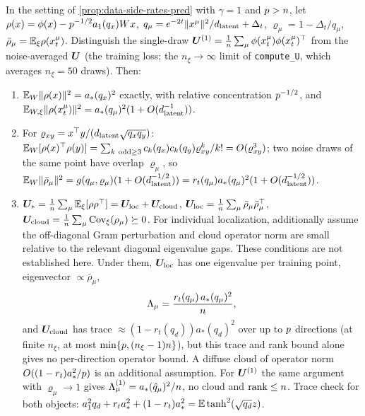 \begin{proposition}\label{prop:sample-bulk-persample-pred}
In the setting of \cref{prop:data-side-rates-pred} with $\gamma=1$ and $p>n$, let $\rho(x)=\phi(x)-p^{-1/2}a_1(q_x)Wx$, $q_\mu=e^{-2t}\|x^\mu\|^2/d_{\mathrm{latent}}+\Delta_t$, $\varrho_\mu=1-\Delta_t/q_\mu$, $\bar\rho_\mu=\mathbb{E}_\xi\rho(x_t^\mu)$. Distinguish the single-draw $\bm{U}^{(1)}=\frac1{n}\sum_\mu\phi(x_t^\mu)\phi(x_t^\mu)^\top$ from the noise-averaged $\bm{U}$ (the training loss; the $n_\xi\to\infty$ limit of \texttt{compute\_U}, which averages $n_\xi=50$ draws). Then:
\begin{enumerate}
\item $\mathbb{E}_W\|\rho(x)\|^2=a_*(q_x)^2$ exactly, with relative concentration $p^{-1/2}$, and $\mathbb{E}_{W,\xi}\|\rho(x_t^\mu)\|^2=a_*(q_\mu)^2(1+O(d_{\mathrm{latent}}^{-1}))$.
\item For $\varrho_{xy}=x^\top y/(d_{\mathrm{latent}}\sqrt{q_xq_y})$: $\E_W[\rho(x)^\top\rho(y)]=\sum_{k\ \mathrm{odd}\ge3}c_k(q_x)c_k(q_y)\varrho_{xy}^k/k!=O(\varrho_{xy}^3)$; two noise draws of the same point have overlap $\varrho_\mu$, so $\mathbb{E}_W\|\bar\rho_\mu\|^2=g(q_\mu,\varrho_\mu)(1+O(d_{\mathrm{latent}}^{-1/2}))=r_t(q_\mu)a_*(q_\mu)^2(1+O(d_{\mathrm{latent}}^{-1/2}))$.
\item $\bm{U}_*=\frac1{n}\sum_\mu\mathbb{E}_\xi[\rho\rho^\top]=\bm{U}_{\rm loc}+\bm{U}_{\rm cloud}$, $\bm{U}_{\rm loc}=\frac1{n}\sum_\mu\bar\rho_\mu\bar\rho_\mu^\top$, $\bm{U}_{\rm cloud}=\frac1{n}\sum_\mu\mathrm{Cov}_\xi(\rho_\mu)\succeq0$. For individual localization, additionally assume the off-diagonal Gram perturbation and cloud operator norm are small relative to the relevant diagonal eigenvalue gaps. These conditions are not established here. Under them, $\bm{U}_{\rm loc}$ has one eigenvalue per training point, eigenvector $\propto\bar\rho_\mu$,
\begin{equation}\label{eq:Lambda-mu-pred}
 \Lambda_\mu=\frac{r_t(q_\mu)\,a_*(q_\mu)^2}{n},
\end{equation}
and $\bm{U}_{\rm cloud}$ has trace $\approx(1-r_t(q_d))a_*(q_d)^2$ over up to $p$ directions (at finite $n_\xi$, at most $\min\{p,(n_\xi-1)n\}$), but this trace and rank bound alone gives no per-direction operator bound. A diffuse cloud of operator norm $O((1-r_t)a_*^2/p)$ is an additional assumption. For $\bm{U}^{(1)}$ the same argument with $\varrho_\mu\to1$ gives $\Lambda^{(1)}_\mu=a_*(\hat q_\mu)^2/n$, no cloud and $\mathrm{rank}\le n$. Trace check for both objects: $a_1^2q_d+r_ta_*^2+(1-r_t)a_*^2=\mathbb{E}\tanh^2(\sqrt{q_d}z)$.

\end{enumerate}
\end{proposition}
